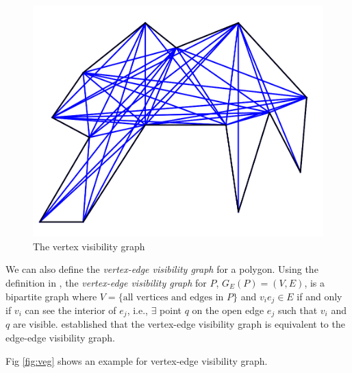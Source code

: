 \documentclass[]{styles/svproc}  %
\begin{document}
\begin{figure}
    \includegraphics[width=0.8\linewidth]{figures/viz_graph.png}
    \centering
    \caption{The vertex visibility graph}\label{fig:vvg}
    \centering
\end{figure}

We can also define the \textit{vertex-edge visibility graph} for a polygon.
Using the definition in \cite{rourke_viz}, the
\textit{vertex-edge visibility graph} for $P$, $G_E(P) = (V, E)$, is a bipartite
graph where $V = \{\text{all vertices and edges in $P$}\}$ and $v_ie_j\in E$ if
and only if $v_i$ can see the interior of $e_j$, i.e., $\exists$ point $q$ on
the open edge $e_j$ such that $v_i$ and $q$ are visible. \cite{rourke_viz}
established that the vertex-edge visibility graph is equivalent to the edge-edge
visibility graph.

Fig \ref{fig:veg} shows an example for vertex-edge visibility graph.
\end{document}

